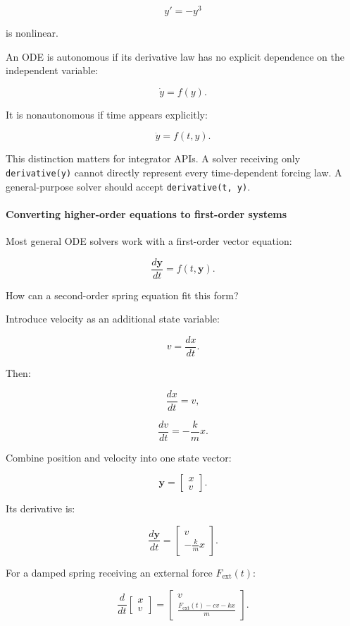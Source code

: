 \[
y'=-y^3
\]

is nonlinear.

An ODE is autonomous if its derivative law has no explicit dependence on the independent variable:

\[
\dot y=f(y).
\]

It is nonautonomous if time appears explicitly:

\[
\dot y=f(t,y).
\]

This distinction matters for integrator APIs. A solver receiving only \texttt{derivative(y)} cannot directly represent every time-dependent forcing law. A general-purpose solver should accept \texttt{derivative(t,\ y)}.

\paragraph{Converting higher-order equations to first-order systems}\label{02-foundations-ii-ch022-converting-higher-order-equations-to-first-order-systems}

\hypertarget{02-foundations-ii-ch022-converting-higher-order-equations-to-first-order-systems}{}

Most general ODE solvers work with a first-order vector equation:

\[
\boxed{ \frac{d\mathbf y}{dt}=f(t,\mathbf y) }.
\]

How can a second-order spring equation fit this form?

Introduce velocity as an additional state variable:

\[
v=\frac{dx}{dt}.
\]

Then:

\[
\frac{dx}{dt}=v,
\]

\[
\frac{dv}{dt}=-\frac{k}{m}x.
\]

Combine position and velocity into one state vector:

\[
\mathbf y= \begin{bmatrix} x\\v \end{bmatrix}.
\]

Its derivative is:

\[
\boxed{ \frac{d\mathbf y}{dt} = \begin{bmatrix} v\\ -\frac{k}{m}x \end{bmatrix} }.
\]

For a damped spring receiving an external force \(F_{\mathrm{ext}}(t)\):

\[
\boxed{ \frac{d}{dt} \begin{bmatrix} x\\v \end{bmatrix} = \begin{bmatrix} v\\ \frac{F_{\mathrm{ext}}(t)-cv-kx}{m} \end{bmatrix} }.
\]

